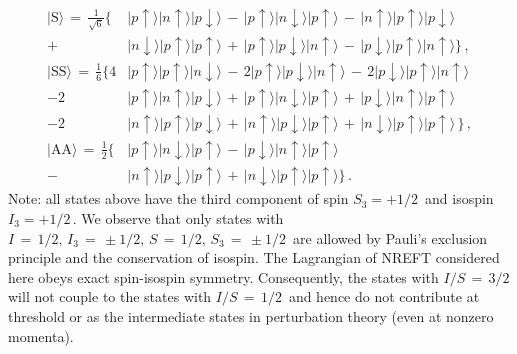 \documentclass[12pt,prd,tightenlines,nofootinbib]{revtex4-2}
\begin{document}
\begin{align}
    | \text{S}\rangle \, =\,\frac{1}{\sqrt{6}}\Big\{ &| p\uparrow\rangle| n\uparrow\rangle| p\downarrow\rangle \, -\, | p\uparrow\rangle| n\downarrow\rangle| p\uparrow\rangle\, -\, | n\uparrow\rangle| p\uparrow\rangle| p\downarrow\rangle \,\nonumber\\[2mm]
    +\, &| n\downarrow\rangle| p\uparrow\rangle| p\uparrow\rangle\, +\, | p\uparrow\rangle| p\downarrow\rangle| n\uparrow\rangle\,-\, | p\downarrow\rangle| p\uparrow\rangle| n\uparrow\rangle \Big\}\,,\nonumber\\[2mm]
     | \text{SS} \rangle \, =\, \frac{1}{6}\Big\{4&| p\uparrow\rangle| p\uparrow\rangle| n\downarrow\rangle\, - \, 2| p\uparrow\rangle| p\downarrow\rangle| n\uparrow\rangle\,-\, 2| p\downarrow\rangle| p\uparrow\rangle| n\uparrow\rangle\,\nonumber\\[2mm]
    -2&| p\uparrow\rangle| n\uparrow\rangle| p\downarrow\rangle\,+\,| p\uparrow\rangle| n\downarrow\rangle| p\uparrow\rangle\,+\, | p\downarrow\rangle| n\uparrow\rangle| p\uparrow\rangle\,\nonumber\\[2mm]
    -2&| n\uparrow\rangle| p\uparrow\rangle| p\downarrow\rangle\,+\, | n\uparrow\rangle| p\downarrow\rangle| p\uparrow\rangle\,+\, | n\downarrow\rangle| p\uparrow\rangle| p\uparrow\rangle\,\Big\}\,,\nonumber\\[2mm]
    |\text{AA}\rangle \, =\, \frac{1}{2}\Big\{ &| p\uparrow\rangle| n\downarrow\rangle| p\uparrow\rangle\, -\, | p\downarrow\rangle| n\uparrow\rangle| p\uparrow\rangle\nonumber\\
    -\,&| n\uparrow\rangle| p\downarrow\rangle| p\uparrow\rangle\, +\, | n\downarrow\rangle| p\uparrow\rangle| p\uparrow\rangle\Big\}\,.\label{state:rest}
\end{align}
Note: all states above have the third component of spin $S_3=+1/2\,$ and isospin $I_3=+1/2\,$. We observe that only states with $I\, =\, 1/2,\,I_{3}\,=\, \pm1/2,\,S\,=\,1/2,\,S_{3}\,=\,\pm1/2\,$ are allowed by Pauli's exclusion principle and the conservation of isospin.
The Lagrangian of NREFT considered here obeys exact spin-isospin symmetry. Consequently,
the states with $I/S\, =\, 3/2\,$ will not couple to the states with $I/S\, = \, 1/2\,$ and hence do not contribute at threshold or as the intermediate states in perturbation theory (even at nonzero momenta).
\end{document}
